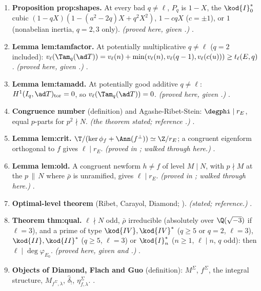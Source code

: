 \begin{sloppypar}
\begin{enumerate}[label=\textbf{\thechapter.\arabic*}]
\item \textbf{Proposition prop:shapes.} At every bad $q\ne\ell$, $P_q$ is $1-X$, the $\kod{I}_0^*$ cubic $(1-qX)(1-(a^2-2q)X+q^2X^2)$, $1-cqX$ ($c=\pm1$), or $1$ (nonabelian inertia, $q=2,3$ only).
\emph{(proved here, given .)} .
\item \textbf{Lemma lem:tamfactor.} At potentially multiplicative $q\ne\ell$ ($q=2$ included): $v_\ell(\Tam_q(\ad T))=v_\ell(n)+\min(v_\ell(n),v_\ell(q-1),v_\ell(c(u)))\ge t_\ell(E,q)$. \emph{(proved here, given
.)} .
\item \textbf{Lemma lem:tamadd.} At potentially good additive $q\ne\ell$: $H^1(I_q,\ad T)_{\mathrm{tor}}=0$, so $v_\ell(\Tam_q(\ad T))=0$. \emph{(proved here, given .)}
.
\item \textbf{Congruence number} (definition) and Agashe-Ribet-Stein: $\degphi\mid r_E$, equal $p$-parts for $p^2\nmid N$. \emph{(the theorem stated; reference \cite[Theorem 2.2]{ARS12}.)}
.
\item \textbf{Lemma lem:crit.} $\T/(\ker\phi_f+\Ann(f^\perp))\simeq\Z/r_E$; a congruent eigenform orthogonal to $f$ gives $\ell\mid r_E$. \emph{(proved in ; walked through here.)}
.
\item \textbf{Lemma lem:old.} A congruent newform $h\ne f$ of level $M\mid N$, with $p\nmid M$ at the $p\,\|\,N$ where $\bar\rho$ is unramified, gives $\ell\mid r_E$. \emph{(proved in ; walked through
here.)} .
\item \textbf{Optimal-level theorem} (Ribet, Carayol, Diamond; \cite[Theorem 3.15]{DDT}). \emph{(stated; reference.)} .
\item \textbf{Theorem thm:qual.} $\ell\nmid N$ odd, $\bar\rho$ irreducible (absolutely over $\Q(\sqrt{-3})$ if $\ell=3$), and a prime of type $\kod{IV},\kod{IV}^*$ ($q\ge5$ or $q=2$, $\ell=3$), $\kod{II},\kod{II}^*$ ($q\ge5$, $\ell=3$) or
$\kod{I}_n^*$ ($n\ge1$, $\ell\mid n$, $q$ odd): then $\ell\mid\deg\varphi_{E_0}$. \emph{(proved here, given  and \cite{ARS12}.)} .
\item \textbf{Objects of Diamond, Flach and Guo} (definition): $M^\Sigma$, $f^\Sigma$, the integral structure, $M_{f^\Sigma,\lambda}$, $\hat\delta_!$, $\eta^\Sigma_{f,\lambda}$. .

\end{enumerate}
\end{sloppypar}
